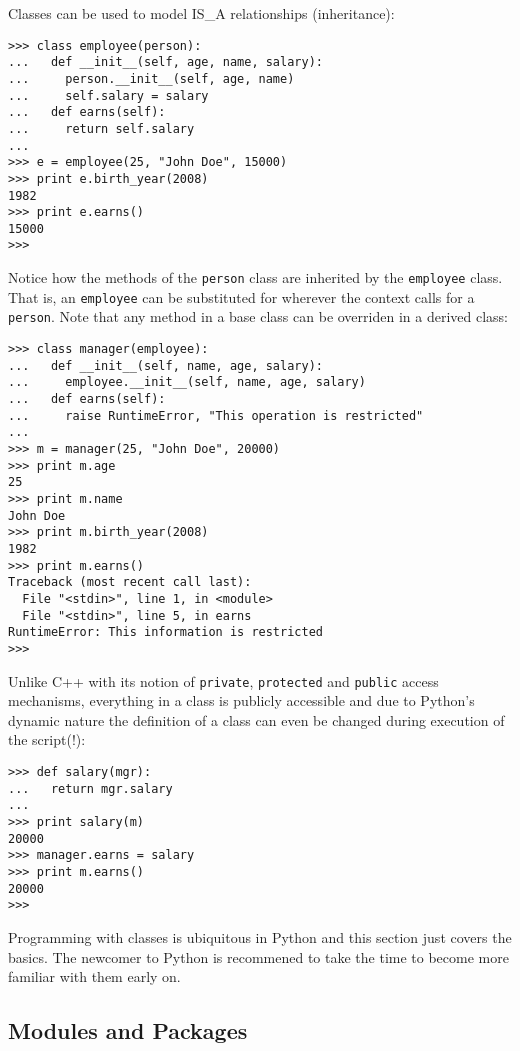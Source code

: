Classes can be used to model IS\_A relationships (inheritance):
\begin{verbatim}
>>> class employee(person):
...   def __init__(self, age, name, salary):
...     person.__init__(self, age, name)
...     self.salary = salary
...   def earns(self):
...     return self.salary
... 
>>> e = employee(25, "John Doe", 15000)
>>> print e.birth_year(2008)
1982
>>> print e.earns()
15000
>>> 
\end{verbatim}
Notice how the methods of the \verb|person| class are inherited by the
\verb|employee| class. That is, an \verb|employee| can be substituted
for wherever the context calls for a \verb|person|. Note that any
method in a base class can be overriden in a derived class:
\begin{verbatim}
>>> class manager(employee):
...   def __init__(self, name, age, salary):
...     employee.__init__(self, name, age, salary)
...   def earns(self):
...     raise RuntimeError, "This operation is restricted"
... 
>>> m = manager(25, "John Doe", 20000)
>>> print m.age
25
>>> print m.name
John Doe
>>> print m.birth_year(2008)
1982
>>> print m.earns()
Traceback (most recent call last):
  File "<stdin>", line 1, in <module>
  File "<stdin>", line 5, in earns
RuntimeError: This information is restricted
>>> 
\end{verbatim}
Unlike C++ with its notion of \verb|private|, \verb|protected| and
\verb|public| access mechanisms, everything in a class is publicly
accessible and due to Python's dynamic nature the definition of a
class can even be changed during execution of the script(!):
\begin{verbatim}
>>> def salary(mgr):
...   return mgr.salary
... 
>>> print salary(m)
20000
>>> manager.earns = salary
>>> print m.earns()
20000
>>> 
\end{verbatim}

Programming with classes is ubiquitous in Python and this section just
covers the basics. The newcomer to Python is recommened to take the
time to become more familiar with them early on.

\subsection{Modules and Packages}

